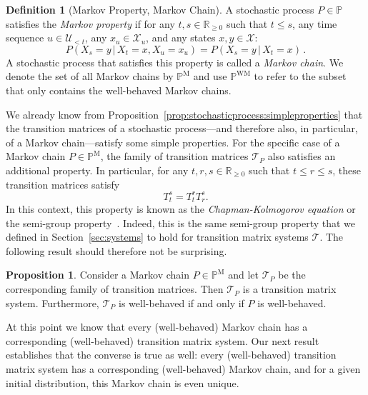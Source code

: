 \documentclass[10pt,a4paper]{paper}
\theoremstyle{definition}
\newtheorem{proposition}[theorem]{Proposition}
\newtheorem{definition}{Definition}
\newcommand{\reals}{\mathbb{R}}
\newcommand{\realsnonneg}{\reals_{\geq 0}}
\newcommand{\states}{\mathcal{X}}
\newcommand{\processes}{\mathbb{P}}
\newcommand{\mprocesses}{\processes^{\mathrm{M}}}
\newcommand{\wmprocesses}{\processes^{\mathrm{WM}}}
\begin{document}
\begin{definition}[Markov Property, Markov Chain]\label{def:markov_property}
A stochastic process $P\in\processes$ satisfies the \emph{Markov property} if for any $t,s\in\realsnonneg$ such that $t\leq s$, any time sequence $u\in\mathcal{U}_{<t}$, any $x_u\in\states_u$, and any states $x,y\in\states$:
\begin{equation*}
P(X_s=y\,\vert\,X_t=x,X_u=x_u) = P(X_s=y\,\vert\, X_{t}=x)\,.
\end{equation*}
A stochastic process that satisfies this property is called a \emph{Markov chain}. We denote the set of all Markov chains by $\mprocesses$ and use $\wmprocesses$ to refer to the subset that only contains the well-behaved Markov chains.
\end{definition}


We already know from Proposition~\ref{prop:stochasticprocess:simpleproperties} that the transition matrices of a stochastic process---and therefore also, in particular, of a Markov chain---satisfy some simple properties. For the specific case of a Markov chain $P\in\mprocesses$, the family of transition matrices $\mathcal{T}_P$ also satisfies an additional property. In particular, for any $t,r,s\in\realsnonneg$ such that $t\leq r\leq s$, these transition matrices satisfy
\begin{equation}\label{eq:markovintermsofmatrices}
T_t^s = T_t^rT_r^s.
\end{equation}
In this context, this property is known as the \emph{Chapman-Kolmogorov equation} or the semi-group property~\cite{liggett2010continuous}. Indeed, this is the same semi-group property that we defined in Section~\ref{sec:systems} to hold for transition matrix systems $\mathcal{T}$. The following result should therefore not be surprising.

\begin{proposition}\label{prop:Markovhassystem}
Consider a Markov chain $P\in\mprocesses$ and let $\mathcal{T}_P$ be the corresponding family of transition matrices. Then $\mathcal{T}_P$ is a transition matrix system. Furthermore, $\mathcal{T}_P$ is well-behaved if and only if $P$ is well-behaved.
\end{proposition}

At this point we know that every (well-behaved) Markov chain has a corresponding (well-behaved) transition matrix system. Our next result establishes that the converse is true as well: every (well-behaved) transition matrix system has a corresponding (well-behaved) Markov chain, and for a given initial distribution, this Markov chain is even unique.
\end{document}
